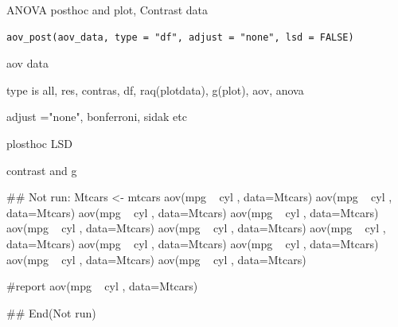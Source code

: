 \documentclass[a4paper]{book}
\begin{document}
%
\begin{Description}
ANOVA posthoc and plot, Contrast data
\end{Description}
%
\begin{Usage}
\begin{verbatim}
aov_post(aov_data, type = "df", adjust = "none", lsd = FALSE)
\end{verbatim}
\end{Usage}
%
\begin{Arguments}
\begin{ldescription}
\item[\code{aov\_data}] aov data

\item[\code{type}] type is all, res, contras, df, raq(plotdata), g(plot), aov, anova

\item[\code{adjust}] adjust ="none", bonferroni, sidak etc

\item[\code{lsd}] plosthoc LSD
\end{ldescription}
\end{Arguments}
%
\begin{Value}
contrast and g
\end{Value}
%
\begin{Examples}
\begin{ExampleCode}

\#\# Not run: 
Mtcars <- mtcars%
aov(mpg ~ cyl , data=Mtcars)%
aov(mpg ~ cyl , data=Mtcars)%
aov(mpg ~ cyl , data=Mtcars)%
aov(mpg ~ cyl , data=Mtcars)%
aov(mpg ~ cyl , data=Mtcars)%
aov(mpg ~ cyl , data=Mtcars)%
aov(mpg ~ cyl , data=Mtcars)%
aov(mpg ~ cyl , data=Mtcars)%
aov(mpg ~ cyl , data=Mtcars)%
aov(mpg ~ cyl , data=Mtcars)%
aov(mpg ~ cyl , data=Mtcars)%

#report
aov(mpg ~ cyl , data=Mtcars)%

## End(Not run)


\end{ExampleCode}
\end{Examples}
\end{document}
